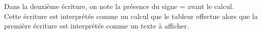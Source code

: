 \setcounter{partie}{0}

\partie
   Dans la deuxième écriture, on note la présence du {\blue signe \og = \fg{}} avant le calcul. \\
   Cette écriture est interprétée comme un {\blue calcul que le tableur effectue} alors que la première écriture est interprétée comme un {\blue texte à afficher.}


